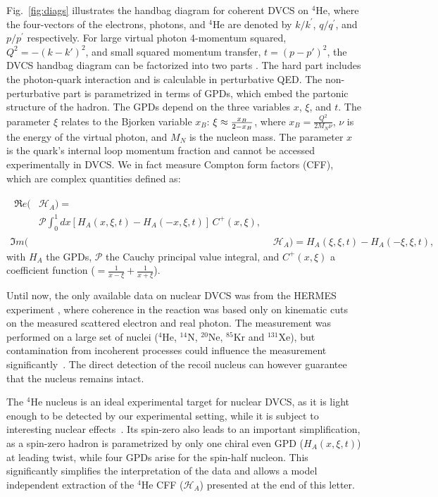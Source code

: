 \documentclass[twocolumn,nofootinbib,showpacs,prl,superscriptaddress,secnumarabic,amssymb,nobibnotes,aps,floatfix]{revtex4}
\begin{document}
Fig.~\ref{fig:diags} illustrates the handbag diagram for coherent DVCS on 
$^4$He, where the four-vectors of the electrons, photons, and $^4$He are denoted 
by $k/k^\prime$, $q/q^\prime$, and $p/p^\prime$ respectively. For large 
virtual photon 4-momentum squared, $Q^2=-(k-k')^{2}$, and small squared 
momentum transfer, $t=(p-p')^{2}$, the DVCS handbag 
diagram can be factorized into two parts \cite{Freund_Collins,Ji_Osborne}. The 
hard part includes the photon-quark interaction and is calculable in 
perturbative QED. The non-perturbative part is parametrized in terms of GPDs, 
which embed the partonic structure of the hadron. The GPDs depend on the three 
variables $x$, $\xi$, and $t$. The 
parameter $\xi$ relates to the Bjorken variable $x_{B}$: $\xi\approx 
{{x_B}\over{2-x_B}}$, where $x_B=\frac{Q^2}{2M_N\nu}$, $\nu$ is the energy of the virtual photon, and 
$M_N$ is the nucleon mass. The parameter $x$ is the quark's internal loop momentum 
fraction and cannot be accessed experimentally in DVCS. We in fact measure 
Compton form factors (CFF), which are complex quantities defined as:

\begin{align}
\begin{split}
\Re e(&\mathcal{H}_{A}) = \\
    &\mathcal{P} 
\int_{0}^{1}dx[H_A(x,\xi,t)-H_A(-x,\xi,t)] \, C^{+}(x,\xi), 
\end{split} \\
\Im m(&\mathcal{H}_{A}) = H_A(\xi,\xi,t)-H_A(-\xi,\xi,t),
\end{align}
with $H_A$ the GPDs, $\mathcal{P}$ 
the Cauchy principal value integral, and $C^{+}(x,\xi)$ a coefficient function 
($=  \frac{1}{x-\xi} + \frac{1}{x+\xi}$).

Until now, the only available data on nuclear DVCS was from the HERMES 
experiment \cite{Ellinghaus:2002zw}, where coherence in the reaction was based 
only on kinematic cuts on the measured scattered electron and real photon. The 
measurement was performed on a large set of nuclei ($^4$He, $^{14}$N, $^{20}$Ne, $^{85}$Kr and $^{131}$Xe), 
but contamination from incoherent processes could influence the measurement 
significantly~\cite{Guzey:2003jh}. The direct detection of the recoil nucleus 
can however guarantee that the nucleus remains intact. 

The $^4$He nucleus is an ideal experimental target for nuclear DVCS, as it is 
light enough to be detected by our experimental setting, while it is subject 
to interesting nuclear effects~\cite{JSeely}. Its spin-zero also leads to an 
important simplification, as a spin-zero hadron is parametrized by only one 
chiral even GPD ($H_{A}(x,\xi,t)$) at leading twist, while four GPDs arise for 
the spin-half nucleon. This significantly simplifies the interpretation of the 
data and allows a model independent extraction of the $^4$He CFF 
($\mathcal{H}_{A}$) presented at the end of this letter. 
\end{document}
